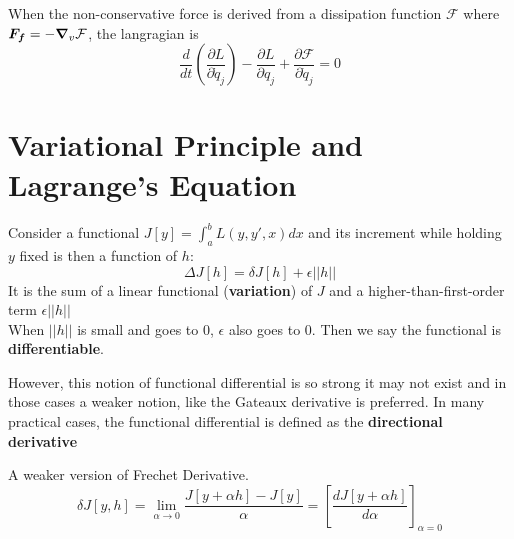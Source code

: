 \documentclass[12pt]{article}
\begin{document}
\begin{theorem}
	When the non-conservative force is derived from a dissipation function $\mathcal{F}$ where $\boldsymbol{F_f} = -\grad_v \mathcal{F}$, the langragian is 
	$$ \frac{d}{dt} \left(\frac{\partial L}{\partial \dot{q}_j}\right) - \frac{\partial L}{\partial q_j} + \frac{\partial \mathcal{F}}{\partial  \dot{q}_j} = 0 $$
\end{theorem}

\section{Variational Principle and Lagrange's Equation}



\begin{theorem}
	\textnormal{
Consider a functional $J[y] = \int_a^b L(y, y', x) dx$ and its increment while holding $y$ fixed is then a function of $h$:
 $$\Delta J[h] = \delta J[h]  + \epsilon||h||$$
It is the sum of a linear functional (\textbf{variation}) of $J$ and a higher-than-first-order term $\epsilon||h||$ \\
When $||h||$ is small and goes to 0, $\epsilon$ also goes to 0. Then we say the functional is \textbf{differentiable}.
}
\end{theorem}
However, this notion of functional differential is so strong it may not exist and in those cases a weaker notion, like the Gateaux derivative is preferred. In many practical cases, the functional differential is defined as the \textbf{directional derivative}

\begin{theorem}
  A weaker version of Frechet Derivative. $$
    \delta J[y, h] = \lim_{\alpha \rightarrow 0} \frac{J[y + \alpha h] - J[y]}{\alpha} = \left[\frac{d J[y + \alpha h]}{d \alpha} \right]_{\alpha =0}
  $$
\end{theorem}
\end{document}
